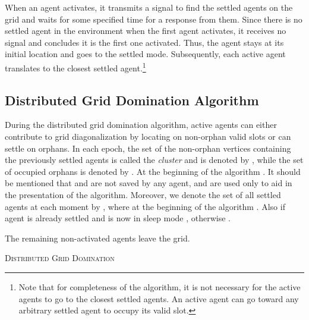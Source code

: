 \documentclass[letterpaper, 10pt, conference]{ieeeconf}
\theoremstyle{definition}
\theoremstyle{remark}
\begin{document}
When an agent activates, it transmits a signal to find the settled agents on the grid and waits for some specified time for a response from them. Since there is no settled agent in the environment when the first agent activates, it receives no signal and concludes it is the  first one activated. Thus, the agent stays at its initial location and goes to the settled mode. Subsequently, each active agent translates to the closest settled agent.\footnote{Note that for completeness of the algorithm, it is not necessary for the active agents to go to the closest settled agents. An active agent can go toward any arbitrary settled agent to occupy its valid slot.}


\subsection{Distributed Grid Domination Algorithm}
\label{susec:dist-alg}
During the distributed grid domination algorithm, active agents can either contribute to grid diagonalization by locating on non-orphan valid slots or can settle on orphans. In each epoch, the set of the non-orphan vertices containing the previously settled agents is called the \emph{cluster} and is denoted by , while the set of occupied orphans is denoted by . At the beginning of the algorithm . It should be mentioned that  and  are not saved by any agent, and are used only to aid in the presentation of the algorithm. Moreover, we denote the set of all settled agents at each moment by , where at the beginning of the algorithm . Also if agent  is already settled and is now in sleep mode , otherwise .


\begin{algorithm2e} 
  \small 
  \DontPrintSemicolon 
    The remaining non-activated agents leave the grid. \;
    \caption{\textsc{Distributed Grid Domination}}
    \label{alg:dist-domin}
\end{algorithm2e}
\end{document}
